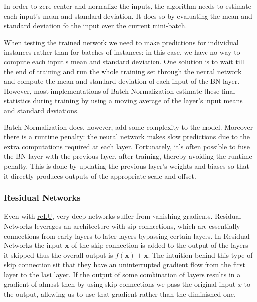 \documentclass[12pt]{article}
\begin{document}
            In order to zero-center and normalize the inputs, the algorithm needs to estimate each input's mean and
            standard deviation. It does so by evaluating the mean and standard deviation fo the input over the current
            mini-batch.
            
            When testing the trained network we need to make predictions for individual instances rather than for
            batches of instances: in this case, we have no way to compute each input's mean and standard deviation. One
            solution is to wait till the end of training and run the whole training set through the neural network and
            compute the mean and standard deviation of each input of the BN layer. However, most implementations of
            Batch Normalization estimate these final statistics during training by using a moving average of the layer's
            input means and standard deviations.

            Batch Normalization does, however, add some complexity to the model. Moreover there is a runtime penalty:
            the neural network makes slow predictions due to the extra computations required at each layer. Fortunately,
            it's often possible to fuse the BN layer with the previous layer, after training, thereby avoiding the
            runtime penalty. This is done by updating the previous layer's weights and biases so that it directly
            produces outputs of the appropriate scale and offset.

        \subsubsection{Residual Networks} \label{sec:ResNet}
            Even with \hyperref[sec:reLU]{reLU}, very deep networks suffer from vanishing gradients. Residual Networks
            leverages an architecture with sip connections, which are essentially connections from early layers to later
            layers bypassing certain layers. In Residual Networks the input $\boldsymbol{x}$ of the skip connection is added to the
            output of the layers it skipped thus the overall output is $f(\boldsymbol{x}) + \boldsymbol{x}$. The
            intuition behind this type of skip connection sit that they have an uninterrupted gradient flow from the
            first layer to the last layer. If the output of some combination of layers results in a gradient of almost
            then by using skip connections we pass the original input $x$ to the output, allowing us to use that
            gradient rather than the diminished one.
\end{document}
